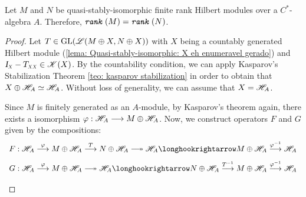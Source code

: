 \begin{teorema}\label{teo: M N quasi stably iso ==> rank igual}
Let $M$ and $N$ be quasi-stably-isomorphic finite rank Hilbert modules over a $C^*$-algebra $A$. Therefore, $\texttt{\textit{rank}}\,(M) = \texttt{\textit{rank}}\,(N)$.
\begin{proof}
Let $T \in \operatorname{GL}(\mathscr L(M\oplus X, N\oplus X))$ with $X$ being a countably generated Hilbert module (\ref{lema: Quasi-stably-isomorphic: X eh enumeravel gerado}) and $\sub \Id X - \sub T{XX} \in \mathscr K(X)$. By the countability condition, we can apply Kasparov's Stabilization Theorem \ref{teo: kasparov stabilization} in order to obtain that $X \oplus \mathscr H_A \simeq \mathscr H_A$. Without loss of generality, we can assume that $X = \mathscr H_A$.

Since $M$ is finitely generated as an $A$-module, by Kasparov's theorem again, there exists a isomorphism $\varphi :\mathscr H_A \longrightarrow M\oplus \mathscr H_A$. Now, we construct operators $F$ and $G$ given by the compositions:
\begin{equation*}
    \begin{array}{c}
         F: \HA \overset{\varphi}{\longto} M\oplus \HA \overset{T}{\longto} N\oplus \HA \longtwoheadrightarrow \HA \longhookrightarrow M\oplus \HA \overset{\inv \varphi}{\longto} {\HA}\\
    \vphantom{\displaystyle\int\limits^b}G: \HA \overset{\varphi}{\longto} M\oplus \HA \longtwoheadrightarrow \HA \longhookrightarrow N \oplus \HA \overset{\inv T}{\longto} M\oplus \HA \overset{\inv \varphi}{\longto} {\HA} 
    \end{array}
\end{equation*}


\end{proof}
\end{teorema}
